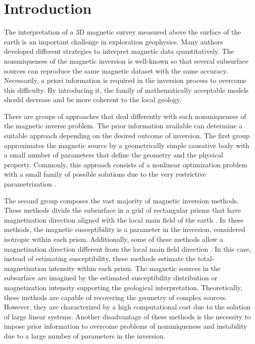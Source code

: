 \section{Introduction}

The interpretation of a 3D magnetic survey measured above the surface of the earth is an important challenge in exploration geophysics. Many authors developed different strategies to interpret magnetic data quantitatively. The nonuniqueness of the magnetic inversion is well-known so that several subsurface sources can reproduce the same magnetic dataset with the same accuracy. Necessarily, a priori information is required in the inversion process to overcome this difficulty. By introducing it, the family of mathematically acceptable models should decrease and be more coherent to the local geology.

There are groups of approaches that deal differently with such nonuniqueness of the magnetic inverse problem. The prior information available can determine a suitable approach depending on the desired outcome of inversion. The first group approximates the magnetic source by a geometrically simple causative body with a small number of parameters that define the geometry and the physical property. Commonly, this approach consists of a nonlinear optimization problem with a small family of possible solutions due to the very restrictive parametrization \cite[]{ballantyne-1980,bhattacharyya-1980,silva-1983}.

The second group composes the vast majority of magnetic inversion methods. These methods divide the subsurface in a grid of rectangular prisms that have magnetization direction aligned with the local main field of the earth \cite[]{cribb-1976,li_3-d_1996,pilkington_3-d_1997} . In these methods, the magnetic susceptibility is a parameter in the inversion, considered isotropic within each prism. Additionally, some of these methods allow a magnetization direction different from the local main field direction \cite[]{pignatelli-2006}. In this case, instead of estimating susceptibility, these methods estimate the total-magnetization intensity within each prism. The magnetic sources in the subsurface are imagined by the estimated susceptibility distribution or magnetization intensity supporting the geological interpretation. Theoretically, these methods are capable of recovering the geometry of complex sources. However, they are characterized by a high computational cost due to the solution of large linear systems. Another disadvantage of these methods is the necessity to impose prior information to overcome problems of nonuniqueness and instability due to a large number of parameters in the inversion.

